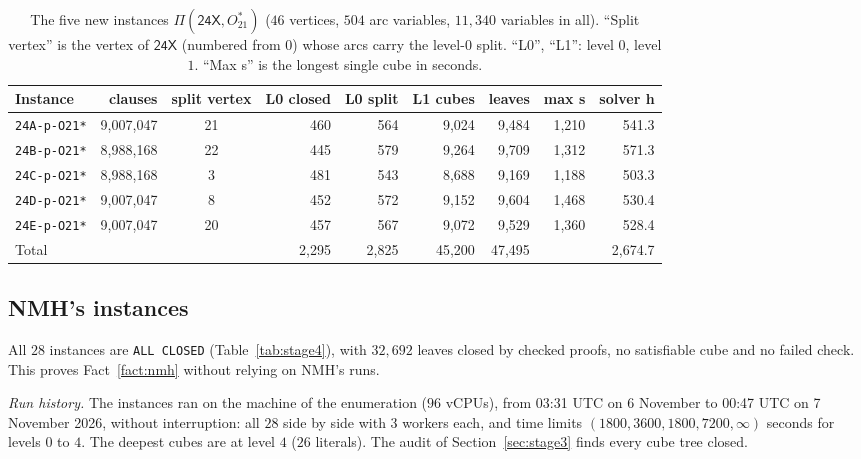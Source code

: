 \documentclass[11pt]{amsart}
\theoremstyle{definition}
\theoremstyle{remark}
\newcommand{\Ostar}{O_{21}^{*}}
\newcommand{\cl}[1]{\textsf{#1}}
\newcommand{\Piv}[2]{\Pi(#1,#2)}
\begin{document}
\begin{table}[ht]
\centering\small
\caption{The five new instances $\Piv{\cl{24X}}{\Ostar}$ ($46$ vertices,
$504$ arc variables, $11{,}340$ variables in all). ``Split vertex'' is the
vertex of $\cl{24X}$ (numbered from $0$) whose arcs carry the level-$0$ split.
``L0'', ``L1'': level $0$, level $1$. ``Max s'' is the longest single cube in
seconds.}
\label{tab:stage3}
\setlength{\tabcolsep}{4pt}
\begin{tabular}{@{}lrcrrrrrr@{}}
\toprule
Instance & clauses & split vertex & L0 closed & L0 split & L1 cubes & leaves & max s & solver h \\
\midrule
\texttt{24A-p-O21*} & 9{,}007{,}047 & 21 & 460 & 564 & 9{,}024 & 9{,}484 & 1{,}210 & 541.3 \\
\texttt{24B-p-O21*} & 8{,}988{,}168 & 22 & 445 & 579 & 9{,}264 & 9{,}709 & 1{,}312 & 571.3 \\
\texttt{24C-p-O21*} & 8{,}988{,}168 & 3 & 481 & 543 & 8{,}688 & 9{,}169 & 1{,}188 & 503.3 \\
\texttt{24D-p-O21*} & 9{,}007{,}047 & 8 & 452 & 572 & 9{,}152 & 9{,}604 & 1{,}468 & 530.4 \\
\texttt{24E-p-O21*} & 9{,}007{,}047 & 20 & 457 & 567 & 9{,}072 & 9{,}529 & 1{,}360 & 528.4 \\
\midrule
Total & & & 2{,}295 & 2{,}825 & 45{,}200 & 47{,}495 & & 2{,}674.7 \\
\bottomrule
\end{tabular}
\end{table}

\subsection{NMH's instances}\label{sec:stage4}
All $28$ instances are \texttt{ALL CLOSED} (Table~\ref{tab:stage4}), with
$32{,}692$ leaves closed by checked proofs, no satisfiable cube and no failed
check. This proves Fact~\ref{fact:nmh} without relying on NMH's runs.

\emph{Run history.} The instances ran on the machine of the enumeration
($96$ vCPUs), from 03:31 UTC on 6 November to 00:47 UTC on 7 November 2026,
without interruption: all $28$ side by side with $3$ workers each, and time
limits $(1800, 3600, 1800, 7200, \infty)$ seconds for levels $0$ to $4$. The
deepest cubes are at level $4$ ($26$ literals). The audit of
Section~\ref{sec:stage3} finds every cube tree closed.
\end{document}
